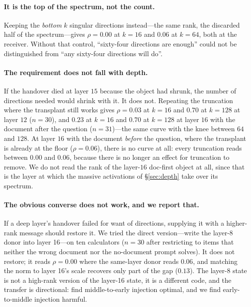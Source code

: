 \documentclass{article}
\begin{document}
\paragraph{It is the top of the spectrum, not the count.} Keeping the
\emph{bottom} $k$ singular directions instead---the same rank, the discarded
half of the spectrum---gives $\rho = 0.00$ at $k=16$ and $0.06$ at $k=64$, both
at the receiver. Without that control, ``sixty-four directions are enough''
could not be distinguished from ``any sixty-four directions will do''.

\paragraph{The requirement does not fall with depth.} If the handover died at
layer $15$ because the object had shrunk, the number of directions needed would
shrink with it. It does not. Repeating the truncation where the transplant still
works gives $\rho = 0.03$ at $k=16$ and $0.70$ at $k=128$ at layer $12$
($n=30$), and $0.23$ at $k=16$ and $0.70$ at $k=128$ at layer $16$ with the
document after the question ($n=31$)---the same curve with the knee between $64$
and $128$. At layer $16$ with the document \emph{before} the question, where the
transplant is already at the floor ($\rho=0.06$), there is no curve at all:
every truncation reads between $0.00$ and $0.06$, because there is no longer an
effect for truncation to remove. We do not read the rank of the layer-$16$
doc-first object at all, since that is the layer at which the massive
activations of \S\ref{sec:depth} take over its spectrum.



\paragraph{The obvious converse does not work, and we report that.} If a deep
layer's handover failed for want of directions, supplying it with a higher-rank
message should restore it. We tried the direct version---write the layer-8
donor into layer 16---on ten calculators ($n=30$ after restricting to items that
neither the wrong document nor the no-document prompt solves). It does not
restore; it reads $\rho = 0.00$ where the same-layer donor reads $0.06$,
and matching the norm to layer 16's scale recovers only part of the gap
($0.13$). The layer-8 state is not a high-rank version of the layer-16 state, it
is a different code, and the transfer is directional:
\citet{ardoin2026promptcompression} find middle-to-early injection optimal, and
we find early-to-middle injection harmful.
\end{document}
